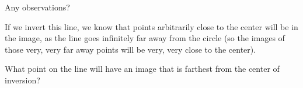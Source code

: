 Any observations?






If we invert this line, we know that points arbitrarily close to the center will be in the image, as the line goes infinitely far away from the circle (so the images of those very, very far away points will be very, very close to the center).

What point on the line will have an image that is farthest from the center of inversion?









